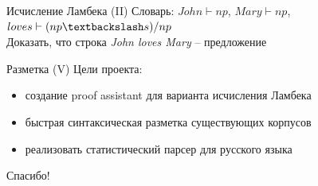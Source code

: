 \documentclass{beamer}
\begin{document}
\begin{frame}{Исчисление Ламбека (II)}
Словарь: {\small $John \vdash np$, $Mary \vdash np$, $loves \vdash (np \textbackslash s)/np$}\\
Доказать, что строка \textit{John loves Mary} -- предложение\\
\medskip

\begin{prooftree}
\end{prooftree}
\end{frame}

\begin{frame}{Разметка (V)}
Цели проекта:\\
\bigskip
\begin{itemize}
    \item создание proof assistant для варианта исчисления Ламбека
    \item быстрая синтаксическая разметка существующих корпусов
    \item реализовать статистический парсер для русского языка
\end{itemize}
\end{frame}

\begin{frame}{}
\begin{center}
Спасибо!
\end{center}
\end{frame}
\end{document}
